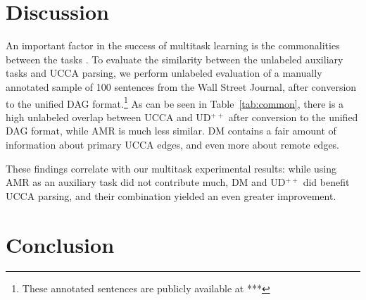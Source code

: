 \documentclass[11pt,a4paper]{article}
\begin{document}
\section{Discussion}\label{sec:discussion}

An important factor in the success of multitask learning is the commonalities between the tasks
\cite{E17-2026,E17-1005}.
To evaluate the similarity between the unlabeled auxiliary tasks and UCCA parsing,
we perform unlabeled evaluation of a manually annotated sample of 100 sentences from the
Wall Street Journal, after conversion to the unified DAG format.\footnote{These annotated
sentences are publicly available at ***}
As can be seen in Table~\ref{tab:common}, there is a high unlabeled overlap between
UCCA and UD$^{++}$ after conversion to the unified DAG format,
while AMR is much less similar.
DM contains a fair amount of information about primary UCCA edges, and even more about remote edges.

These findings correlate with our multitask experimental results:
while using AMR as an auxiliary task did not contribute much, DM and UD$^{++}$ did benefit UCCA
parsing, and their combination yielded an even greater improvement.

\section{Conclusion}




\end{document}

